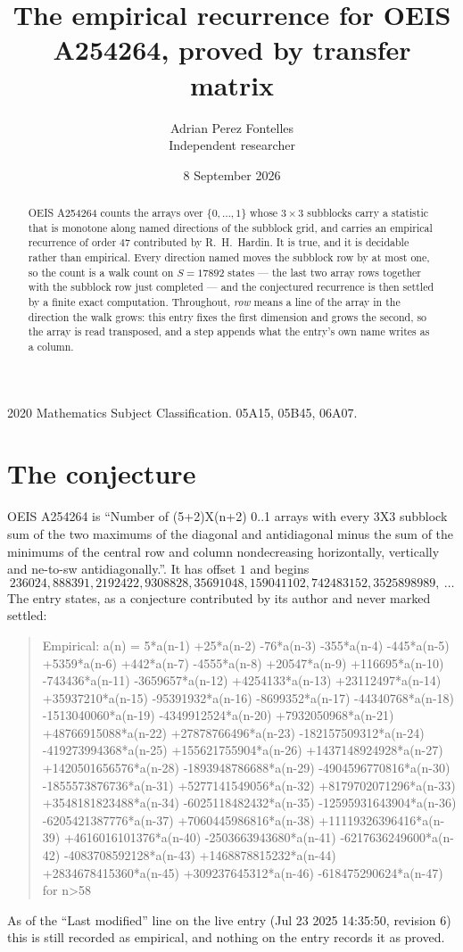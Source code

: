 \documentclass[11pt,a4paper]{article}
\title{The empirical recurrence for OEIS A254264, proved by transfer matrix}
\author{Adrian Perez Fontelles\\ \small Independent researcher}
\date{8 September 2026}
\theoremstyle{plain}
\theoremstyle{definition}
\begin{document}
\maketitle

\begin{abstract}
OEIS A254264 counts the arrays over $\{0,\dots,1\}$ whose $3\times3$ subblocks carry a
statistic that is monotone along named directions of the subblock grid, and carries an
empirical recurrence of order $47$ contributed by R.~H.~Hardin. It is true, and it is
decidable rather than empirical. Every direction named moves the subblock row by at most one,
so the count is a walk count on $S=17892$ states --- the last two array rows together with the
subblock row just completed --- and the conjectured recurrence is then settled by a finite
exact computation.
 Throughout, \emph{row} means a line of the array in the direction the walk grows: this entry fixes the first dimension and grows the second, so the array is read transposed, and a step appends what the entry's own name writes as a column.\end{abstract}

\noindent\small 2020 Mathematics Subject Classification. 05A15, 05B45, 06A07.\normalsize

\section{The conjecture}

OEIS A254264 is ``Number of (5+2)X(n+2) 0..1 arrays with every 3X3 subblock sum of the two maximums of the diagonal and antidiagonal minus the sum of the minimums of the central row and column nondecreasing horizontally, vertically and ne-to-sw antidiagonally.''. It has offset $1$ and begins
\[
236024, 888391, 2192422, 9308828, 35691048, 159041102, 742483152, 3525898989,\ \dots
\]
The entry states, as a conjecture contributed by its author and never marked settled:
\begin{quote}
Empirical: a(n) = 5*a(n-1) +25*a(n-2) -76*a(n-3) -355*a(n-4) -445*a(n-5) +5359*a(n-6) +442*a(n-7) -4555*a(n-8) +20547*a(n-9) +116695*a(n-10) -743436*a(n-11) -3659657*a(n-12) +4254133*a(n-13) +23112497*a(n-14) +35937210*a(n-15) -95391932*a(n-16) -8699352*a(n-17) -44340768*a(n-18) -1513040060*a(n-19) -4349912524*a(n-20) +7932050968*a(n-21) +48766915088*a(n-22) +27878766496*a(n-23) -182157509312*a(n-24) -419273994368*a(n-25) +155621755904*a(n-26) +1437148924928*a(n-27) +1420501656576*a(n-28) -1893948786688*a(n-29) -4904596770816*a(n-30) -1855573876736*a(n-31) +5277141549056*a(n-32) +8179702071296*a(n-33) +3548181823488*a(n-34) -6025118482432*a(n-35) -12595931643904*a(n-36) -6205421387776*a(n-37) +7060445986816*a(n-38) +11119326396416*a(n-39) +4616016101376*a(n-40) -2503663943680*a(n-41) -6217636249600*a(n-42) -4083708592128*a(n-43) +1468878815232*a(n-44) +2834678415360*a(n-45) +309237645312*a(n-46) -618475290624*a(n-47) for n>58
\end{quote}
As of the ``Last modified'' line on the live entry (Jul 23 2025 14:35:50, revision 6) this is still
recorded as empirical, and nothing on the entry records it as proved.
\end{document}
